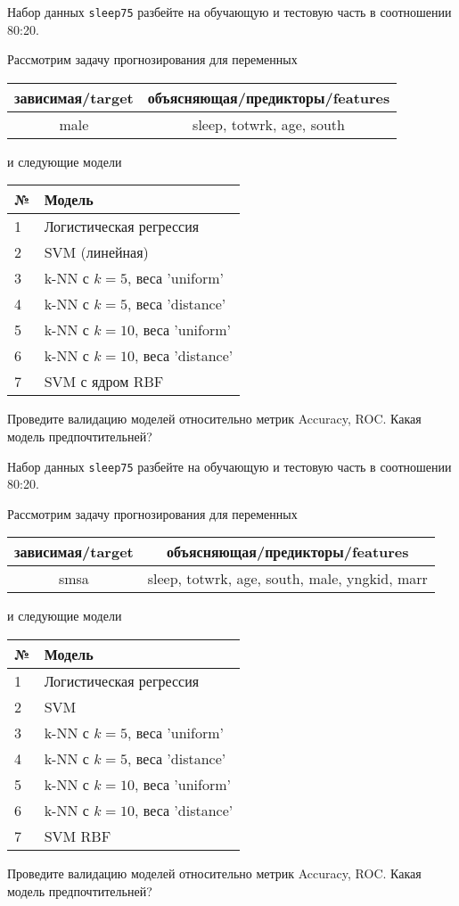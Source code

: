 \begin{exercise}
Набор данных \texttt{sleep75} разбейте на обучающую и тестовую часть
в соотношении 80:20.

Рассмотрим задачу прогнозирования для переменных
\begin{center}
	\begin{tabular}{|c|c|}\hline
		зависимая/target & объясняющая/предикторы/features \\ \hline
		male & sleep, totwrk, age, south \\ \hline
	\end{tabular}
\end{center}
и следующие модели
\begin{center}
	\begin{tabular}{|l|l|}\hline
		№ & Модель \\ \hline
		1 & Логистическая регрессия\\
		2 & SVM (линейная) \\ 
		3 & k-NN с \(k=5\), веса 'uniform' \\
		4 & k-NN с \(k=5\), веса 'distance' \\
		5 & k-NN с \(k=10\), веса 'uniform' \\
		6 & k-NN с \(k=10\), веса 'distance' \\ 
		7 & SVM с ядром RBF \\ \hline
	\end{tabular}
\end{center}
Проведите валидацию моделей относительно метрик Accuracy, ROC. 
Какая модель предпочтительней?
\end{exercise}

\begin{exercise}
Набор данных \texttt{sleep75} разбейте на обучающую и тестовую часть
в соотношении 80:20.

Рассмотрим задачу прогнозирования для переменных
\begin{center}
	\begin{tabular}{|c|c|}\hline
		зависимая/target & объясняющая/предикторы/features \\ \hline
		smsa & sleep, totwrk, age, south, male, yngkid, marr \\ \hline
	\end{tabular}
\end{center}
и следующие модели
\begin{center}
	\begin{tabular}{|l|l|}\hline
		№ & Модель \\ \hline
		1 & Логистическая регрессия\\
		2 & SVM \\ 
		3 & k-NN с \(k=5\), веса 'uniform' \\
		4 & k-NN с \(k=5\), веса 'distance' \\
		5 & k-NN с \(k=10\), веса 'uniform' \\
		6 & k-NN с \(k=10\), веса 'distance' \\ 
		7 & SVM RBF \\ \hline
	\end{tabular}
\end{center}
Проведите валидацию моделей относительно метрик Accuracy, ROC. Какая модель предпочтительней?
\end{exercise}

